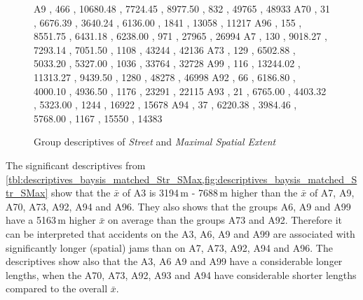 \begin{figure}[ht!]
\begin{minipage}{0.55\textwidth}
{			A9  , 466 , 10680.48 , 7724.45  , 8977.50  , 832  , 49765 , 48933 
			A70 , 31  , 6676.39  , 3640.24  , 6136.00  , 1841 , 13058 , 11217 
			A96 , 155 , 8551.75  , 6431.18  , 6238.00  , 971  , 27965 , 26994 
			A7  , 130 , 9018.27  , 7293.14  , 7051.50  , 1108 , 43244 , 42136 
			A73 , 129 , 6502.88  , 5033.20  , 5327.00  , 1036 , 33764 , 32728 
			A99 , 116 , 13244.02 , 11313.27 , 9439.50  , 1280 , 48278 , 46998 
			A92 , 66  , 6186.80  , 4000.10  , 4936.50  , 1176 , 23291 , 22115 
			A93 , 21  , 6765.00  , 4403.32  , 5323.00  , 1244 , 16922 , 15678 
			A94 , 37  , 6220.38  , 3984.46  , 5768.00  , 1167 , 15550 , 14383   
		}\data
		\pgfplotstablesort[sort key=mean, sort cmp=float >]{\datasorted}{\data}
		\tiny
		\centering
		\label{fig:descriptives_baysis_matched_Str_SMax}
	\end{minipage}%
	\caption{Group descriptives of \textit{Street} and \textit{Maximal Spatial Extent}}
\end{figure}
The significant descriptives from \cref{tbl:descriptives_baysis_matched_Str_SMax,fig:descriptives_baysis_matched_Str_SMax} show that the $\bar{x}$ of A3 is 3194\,m - 7688\,m higher than the $\bar{x}$ of A7, A9, A70, A73, A92, A94 and A96. They also shows that the groups A6, A9 and A99 have a 5163\,m higher $\bar{x}$ on average than the groups A73 and A92. Therefore it can be interpreted that accidents on the A3, A6, A9 and A99 are associated with significantly longer (spatial) jams than on A7, A73, A92, A94 and A96. The descriptives show also that the A3, A6 A9 and A99 have a considerable longer lengths, when the A70, A73, A92, A93 and A94 have considerable shorter lengths compared to the overall $\bar{x}$.
